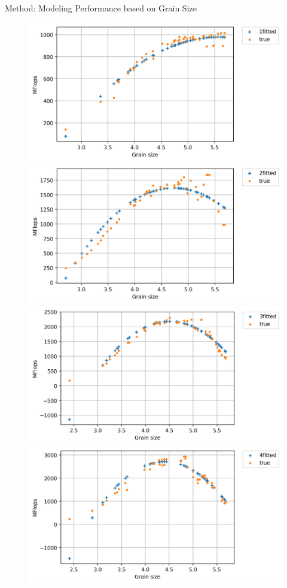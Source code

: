 \documentclass[10pt]{beamer}
\begin{document}
\begin{frame}{Method: Modeling Performance based on Grain Size}
	\begin{outline}	
		\begin{figure}[H]
			\centering
			{\includegraphics[scale=.2]{images/polyfit/fig_1_690.png}\label{fig10:a}}
			{\includegraphics[scale=.2]{images/polyfit/fig_2_690.png}\label{fig10:b}}{\hfill}
			{\includegraphics[scale=.2]{images/polyfit/fig_3_690.png}\label{fig10:c}}
			{\includegraphics[scale=.2]{images/polyfit/fig_4_690.png}\label{fig10:d}}{\hfill}

\end{figure}
\end{outline}
\end{frame}
\end{document}
